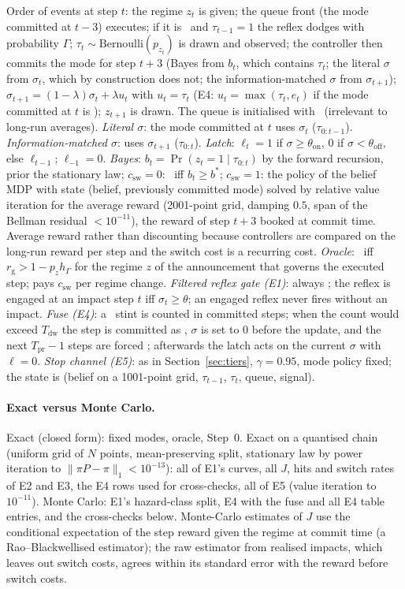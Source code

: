 Order of events at step $t$: the regime $z_t$ is given; the queue front (the mode committed at $t-3$) executes; if it is \WORK\ and $\tau_{t-1}=1$ the reflex dodges with probability $\Gamma$; $\tau_t\sim\mathrm{Bernoulli}(p_{z_t})$ is drawn and observed; the controller then commits the mode for step $t+3$ (Bayes from $b_t$, which contains $\tau_t$; the literal $\sigma$ from $\sigma_t$, which by construction does not; the information-matched $\sigma$ from $\sigma_{t+1}$); $\sigma_{t+1}=(1-\lambda)\sigma_t+\lambda u_t$ with $u_t=\tau_t$ (E4: $u_t=\max(\tau_t,e_t)$ if the mode committed at $t$ is \GUARD); $z_{t+1}$ is drawn. The queue is initialised with \WORK\ (irrelevant to long-run averages). \emph{Literal $\sigma$}: the mode committed at $t$ uses $\sigma_t$ ($\tau_{0:t-1}$). \emph{Information-matched $\sigma$}: uses $\sigma_{t+1}$ ($\tau_{0:t}$). \emph{Latch}: $\ell_t=1$ if $\sigma\ge\theta_{\mathrm{on}}$, $0$ if $\sigma<\theta_{\mathrm{off}}$, else $\ell_{t-1}$; $\ell_{-1}=0$. \emph{Bayes}: $b_t=\Pr(z_t=1\mid\tau_{0:t})$ by the forward recursion, prior the stationary law; $c_{\mathrm{sw}}=0$: \GUARD\ iff $b_t\ge b^*$; $c_{\mathrm{sw}}=1$: the policy of the belief MDP with state (belief, previously committed mode) solved by relative value iteration for the average reward (2001-point grid, damping $0.5$, span of the Bellman residual $<10^{-11}$), the reward of step $t+3$ booked at commit time. Average reward rather than discounting because controllers are compared on the long-run reward per step and the switch cost is a recurring cost. \emph{Oracle}: \GUARD\ iff $r_{\mathrm g}>1-p_{z}h_\Gamma$ for the regime $z$ of the announcement that governs the executed step; pays $c_{\mathrm{sw}}$ per regime change. \emph{Filtered reflex gate (E1)}: always \WORK; the reflex is engaged at an impact step $t$ iff $\sigma_t\ge\theta$; an engaged reflex never fires without an impact. \emph{Fuse (E4)}: a \GUARD\ stint is counted in committed steps; when the count would exceed $T_{\mathrm{dw}}$ the step is committed as \WORK, $\sigma$ is set to $0$ before the update, and the next $T_{\mathrm{pr}}-1$ steps are forced \WORK; afterwards the latch acts on the current $\sigma$ with $\ell=0$. \emph{Stop channel (E5)}: as in Section~\ref{sec:tiers}, $\gamma=0.95$, mode policy fixed; the state is (belief on a 1001-point grid, $\tau_{t-1}$, $\tau_t$, queue, signal).

\paragraph{Exact versus Monte Carlo.}
Exact (closed form): fixed modes, oracle, Step~0. Exact on a quantised chain (uniform grid of $N$ points, mean-preserving split, stationary law by power iteration to $\|\pi P-\pi\|_1<10^{-13}$): all of E1's curves, all $J$, hits and switch rates of E2 and E3, the E4 rows used for cross-checks, all of E5 (value iteration to $10^{-11}$). Monte Carlo: E1's hazard-class split, E4 with the fuse and all E4 table entries, and the cross-checks below. Monte-Carlo estimates of $J$ use the conditional expectation of the step reward given the regime at commit time (a Rao--Blackwellised estimator); the raw estimator from realised impacts, which leaves out switch costs, agrees within its standard error with the reward before switch costs.

